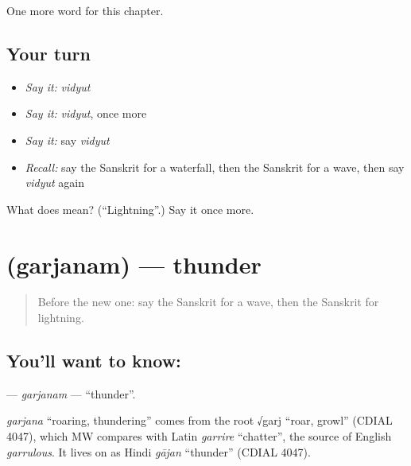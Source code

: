\begin{grammarlens}[title={What you've built}]
One more word for this chapter.
\end{grammarlens}

\subsection*{Your turn}
\begin{itemize}
\raggedright
  \item \emph{Say it:} \emph{vidyut}
  \item \emph{Say it:} \emph{vidyut}, once more
  \item \emph{Say it:} say \emph{vidyut}
  \item \emph{Recall:} say the Sanskrit for a waterfall, then the Sanskrit for a wave, then say \emph{vidyut} again
\end{itemize}

\begin{tcolorbox}[breakable,colback=teal!4,colframe=teal!35!black,title={Before you move on}]
What does  mean? (\textquotedblleft{}Lightning\textquotedblright{}.) Say it once more.
\end{tcolorbox}
\section[\texorpdfstring{\sk{गर्जनम्} (garjanam)}{गर्जनम् (garjanam)}]{ (garjanam) — thunder}

\label{lesson:SA-C110-garjanam}



\begin{quote}
Before the new one: say the Sanskrit for a wave, then the Sanskrit for lightning.
\end{quote}

\subsection*{You'll want to know: }
\textbf{} — \emph{garjanam} — \textquotedblleft{}thunder\textquotedblright{}.

\begin{cousinweb}
\emph{garjana} \textquotedblleft{}roaring, thundering\textquotedblright{} comes from the root √garj \textquotedblleft{}roar, growl\textquotedblright{} (CDIAL 4047), which MW compares with Latin \emph{garrire} \textquotedblleft{}chatter\textquotedblright{}, the source of English \emph{garrulous}. It lives on as Hindi \emph{gājan} \textquotedblleft{}thunder\textquotedblright{} (CDIAL 4047).
\end{cousinweb}

